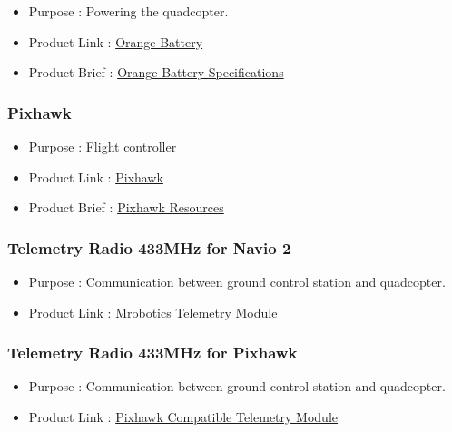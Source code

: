 \documentclass[a4paper,12pt,oneside]{book}
\begin{document}
\begin{itemize}
  \item Purpose : Powering the quadcopter.
  \item Product Link : \href{https://robu.in/product/orange-11-1v-6200mah-3s-40c-lipo-battery-pack-xt60-connector/}{Orange Battery} 
  \item Product Brief : \href{https://robu.in/product/orange-11-1v-6200mah-3s-40c-lipo-battery-pack-xt60-connector/}{Orange Battery Specifications} 
 \end{itemize}
 
  \subsubsection{Pixhawk} 
\begin{itemize}
  \item Purpose : Flight controller
  \item Product Link : \href{https://robokits.co.in/drones-quad-hexa-octa-fpv/flight-controllers/pixhawk-px4-2.4.8-32bit-flight-controller-with-imp.-accessories}{Pixhawk} 
  \item Product Brief : \href{https://pixhawk.org/}{Pixhawk Resources} 
 \end{itemize}
 
\subsubsection{Telemetry Radio 433MHz for Navio 2 } 

\begin{itemize}
  \item Purpose : Communication between ground control station and quadcopter. 
  \item Product Link : \href{https://store.mrobotics.io/mRo-SiK-Telemetry-Radio-V2-433Mhz-p/mro-433sikv2-mr.htm}{Mrobotics Telemetry Module} 
 \end{itemize}

\subsubsection{Telemetry Radio 433MHz for Pixhawk } 

\begin{itemize}
  \item Purpose : Communication between ground control station and quadcopter. 
  \item Product Link : \href{https://robokits.co.in/drones-quad-hexa-octa-fpv/fpv-video-telemetry-osd/433mhz-telemetry-module-pair-for-pixhawk-and-apm-100mw-2km-range}{Pixhawk Compatible Telemetry Module} 
   \end{itemize}
 
\end{document}
